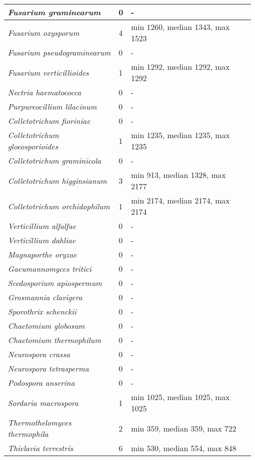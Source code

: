 {\begin{longtable}{| L{4cm} | L{2cm}  | L{5cm} | L{4cm} |}
\textit{Fusarium graminearum} & 0 & - & \\ \hline
\textit{Fusarium oxysporum} & 4 & min 1260, median 1343, max 1523 & \\ \hline
\textit{Fusarium pseudograminearum} & 0 & - & \\ \hline
\textit{Fusarium verticillioides} & 1 & min 1292, median 1292, max 1292 & \\ \hline
\textit{Nectria haematococca} & 0 & - & \\ \hline
\textit{Purpureocillium lilacinum} & 0 & - & \\ \hline
\textit{Colletotrichum fioriniae} & 0 & - & \\ \hline
\textit{Colletotrichum gloeosporioides} & 1 & min 1235, median 1235, max 1235 & \\ \hline
\textit{Colletotrichum graminicola} & 0 & - & \\ \hline
\textit{Colletotrichum higginsianum} & 3 & min 913, median 1328, max 2177 & \\ \hline
\textit{Colletotrichum orchidophilum} & 1 & min 2174, median 2174, max 2174 & \\ \hline
\textit{Verticillium alfalfae} & 0 & - & \\ \hline
\textit{Verticillium dahliae} & 0 & - & \\ \hline
\textit{Magnaporthe oryzae} & 0 & - & \\ \hline
\textit{Gaeumannomyces tritici} & 0 & - & \\ \hline
\textit{Scedosporium apiospermum} & 0 & - & \\ \hline
\textit{Grosmannia clavigera} & 0 & - & \\ \hline
\textit{Sporothrix schenckii} & 0 & - & \\ \hline
\textit{Chaetomium globosum} & 0 & - & \\ \hline
\textit{Chaetomium thermophilum} & 0 & - & \\ \hline
\textit{Neurospora crassa} & 0 & - & \\ \hline
\textit{Neurospora tetrasperma} & 0 & - & \\ \hline
\textit{Podospora anserina} & 0 & - & \\ \hline
\textit{Sordaria macrospora} & 1 & min 1025, median 1025, max 1025 & \\ \hline
\textit{Thermothelomyces thermophila} & 2 & min 359, median 359, max 722 & \\ \hline
\textit{Thielavia terrestris} & 6 & min 530, median 554, max 848 & \\ \hline

\end{longtable}}
